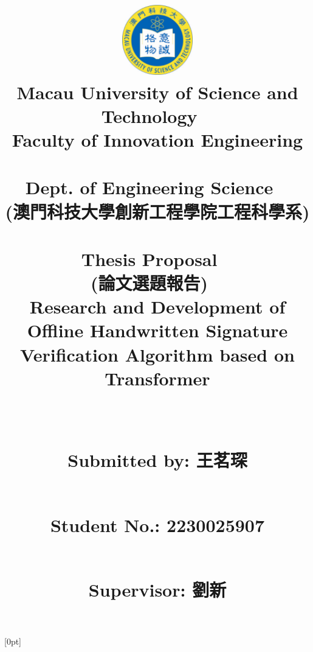 \documentclass{article}
\begin{document}
\title{\includegraphics[width=1.2in]{MUST.png}\\[-2pt]\huge Macau University of Science and Technology
~\\
Faculty of Innovation Engineering
~\\
Dept. of Engineering Science
~\\
\LARGE{(澳門科技大學創新工程學院工程科學系)}
~\\[40pt]

Thesis Proposal 
~\\
(論文選題報告)
~\\[40pt]

\textbf{\LARGE Research and Development of Offline Handwritten Signature Verification Algorithm based on Transformer}

\title{}

~\\[50pt]





\large{

 Submitted by: 王茗琛


~\\[1pt]

 Student No.: 2230025907

~\\[1pt]

 Supervisor: 劉新} 
 
     } 

\author{}

\date{}


[0pt]{\addvspace{5pt}\filright}              
{\contentspush{\thecontentslabel\ 
}}              
{}{\contentspage}


\maketitle
\thispagestyle{empty}

\clearpage
\end{document}
